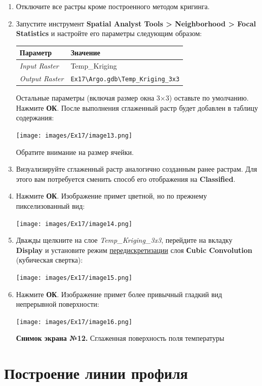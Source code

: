 \documentclass[12pt,]{book}
\begin{document}
\begin{enumerate}
\def\labelenumi{\arabic{enumi}.}
\item
  Отключите все растры кроме построенного методом кригинга.
\item
  Запустите инструмент \textbf{Spatial Analyst Tools \textgreater{} Neighborhood \textgreater{} Focal Statistics} и настройте его параметры следующим образом:

  \begin{longtable}[]{@{}ll@{}}
  \toprule
  Параметр & Значение\tabularnewline
  \midrule
  \endhead
  \emph{Input Raster} & Temp\_Kriging\tabularnewline
  \emph{Output Raster} & \texttt{Ex17\textbackslash{}Argo.gdb\textbackslash{}Temp\_Kriging\_3x3}\tabularnewline
  \bottomrule
  \end{longtable}

  Остальные параметры (включая размер окна 3×3) оставьте по умолчанию. Нажмите \textbf{ОК}. После выполнения сглаженный растр будет добавлен в таблицу содержания:

  \texttt{[image: images/Ex17/image13.png]}

  Обратите внимание на размер ячейки.
\item
  Визуализируйте сглаженный растр аналогично созданным ранее растрам. Для этого вам потребуется сменить способ его отображения на \textbf{Classified}.
\item
  Нажмите \textbf{ОК}. Изображение примет цветной, но по прежнему пикселизованный вид:

  \texttt{[image: images/Ex17/image14.png]}
\item
  Дважды щелкните на слое \emph{Temp\_Kriging\_3x3}, перейдите на вкладку \textbf{Display} и установите режим \href{https://ru.wikipedia.org/wiki/Передискретизация}{передискретизации} слоя \textbf{Сubic Convolution} (кубическая свертка):

  \texttt{[image: images/Ex17/image15.png]}
\item
  Нажмите \textbf{ОК}. Изображение примет более привычный гладкий вид непрерывной поверхности:

  \texttt{[image: images/Ex17/image16.png]}

  \textbf{Снимок экрана №12.} Сглаженная поверхность поля температуры
\end{enumerate}

\hypertarget{interpolation-profile}{%
\section{Построение линии профиля}\label{interpolation-profile}}
\end{document}
